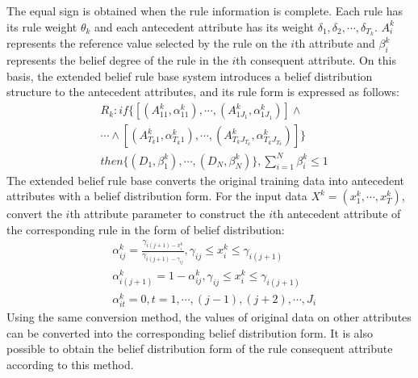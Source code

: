\documentclass{ieeeaccess}
\begin{document}
The equal sign is obtained when the rule information is complete. Each rule has its rule weight $\theta_k$ and each antecedent attribute has its weight $\delta_{1},\delta_{2},\cdots,\delta_{T_k}$.
$A_i^k$ represents the reference value selected by the rule on the $i$th attribute and $\beta_i^k$ represents the belief degree of the rule in the $i$th consequent attribute.
On this basis, the extended belief rule base system introduces a belief distribution structure to the antecedent attributes, and its rule form is expressed as follows:
\begin{equation}
    \begin{split}
        &R_k:if\{[(A_{11}^k,\alpha_{11}^k),\cdots,(A_{1J_1}^k,\alpha_{1J_1}^k)] \wedge \\
        &\cdots \wedge [(A_{T_k1}^k,\alpha_{T_k1}^k), \cdots,(A_{T_kJ_{T_k}}^k,\alpha_{T_kJ_{T_k}}^k)]\}\\
        &then\{(D_1,\beta_1^k),\cdots,(D_N,\beta_N^k)\},\sum_{i=1}^N\beta_i^k\leq1
    \end{split}
\end{equation}
The extended belief rule base converts the original training data into antecedent attributes with a belief distribution form.
For the input data $X^k=(x_1^k,\cdots,x_T^k)$, convert the $i$th attribute parameter to construct the $i$th antecedent attribute of the corresponding rule in the form of belief distribution:
\begin{equation}
    \begin{split}
        &\alpha_{ij}^k=\frac{\gamma_{i(j+1)-x_i^k}}{\gamma_{i(j+1)-\gamma_{ij}}},\gamma_{ij}\leq x_i^k\leq \gamma_{i(j+1)}\\
        &\alpha_{i(j+1)}^k=1-\alpha_{ij}^k,\gamma_{ij}\leq x_i^k\leq \gamma_{i(j+1)} \\
        &\alpha_{it}^k=0,t=1,\cdots,(j-1),(j+2),\cdots,J_i
    \end{split}
\end{equation}
Using the same conversion method, the values of original data on other attributes can be converted into the corresponding belief distribution form.
It is also possible to obtain the belief distribution form of the rule consequent attribute according to this method.
\end{document}
